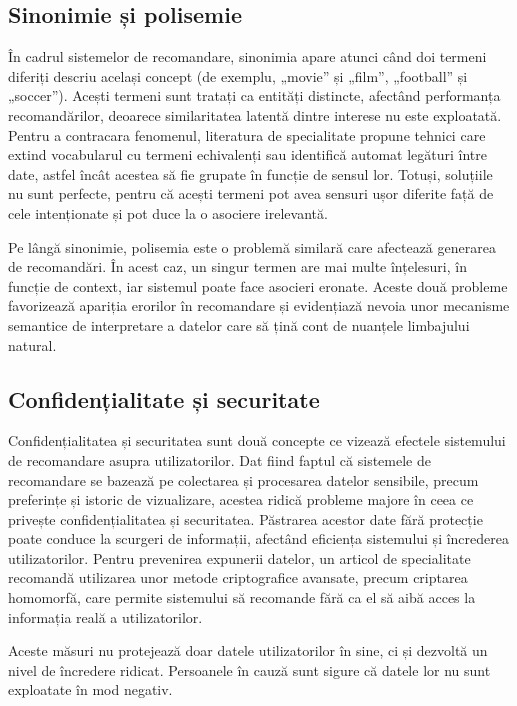 \subsection{Sinonimie și polisemie}
\label{subsec:ch3sec4sub2}
În cadrul sistemelor de recomandare, sinonimia apare atunci când doi termeni diferiți descriu același concept (de exemplu, „movie” și „film”, „football” și „soccer”).
Acești termeni sunt tratați ca entități distincte, afectând performanța recomandărilor, deoarece similaritatea latentă dintre interese nu este exploatată.
Pentru a contracara fenomenul, literatura de specialitate propune tehnici care extind vocabularul cu termeni echivalenți sau identifică automat legături între date, astfel încât acestea să fie grupate în funcție de sensul lor.
Totuși, soluțiile nu sunt perfecte, pentru că acești termeni pot avea sensuri ușor diferite față de cele intenționate și pot duce la o asociere irelevantă\cite{mansur2017review}.
\par
Pe lângă sinonimie, polisemia este o problemă similară care afectează generarea de recomandări. În acest caz, un singur termen are mai multe înțelesuri, în funcție de context, iar sistemul poate face asocieri eronate.
Aceste două probleme favorizează apariția erorilor în recomandare și evidențiază nevoia unor mecanisme semantice de interpretare a datelor care să țină cont de nuanțele limbajului natural\cite{lops2011content}.

\subsection{Confidențialitate și securitate}
\label{subsec:ch3sec4sub3}
Confidențialitatea și securitatea sunt două concepte ce vizează efectele sistemului de recomandare asupra utilizatorilor.
Dat fiind faptul că sistemele de recomandare se bazează pe colectarea și procesarea datelor sensibile, precum preferințe și istoric de vizualizare, acestea ridică probleme majore în ceea ce privește confidențialitatea și securitatea.
Păstrarea acestor date fără protecție poate conduce la scurgeri de informații, afectând eficiența sistemului și încrederea utilizatorilor\cite{huang2019privacy}.
Pentru prevenirea expunerii datelor, un articol de specialitate recomandă utilizarea unor metode criptografice avansate, precum criptarea homomorfă, care permite sistemului să recomande fără ca el să aibă acces la informația reală a utilizatorilor\cite{badsha2016practical}.
\par
Aceste măsuri nu protejează doar datele utilizatorilor în sine, ci și dezvoltă un nivel de încredere ridicat. 
Persoanele în cauză sunt sigure că datele lor nu sunt exploatate în mod negativ.